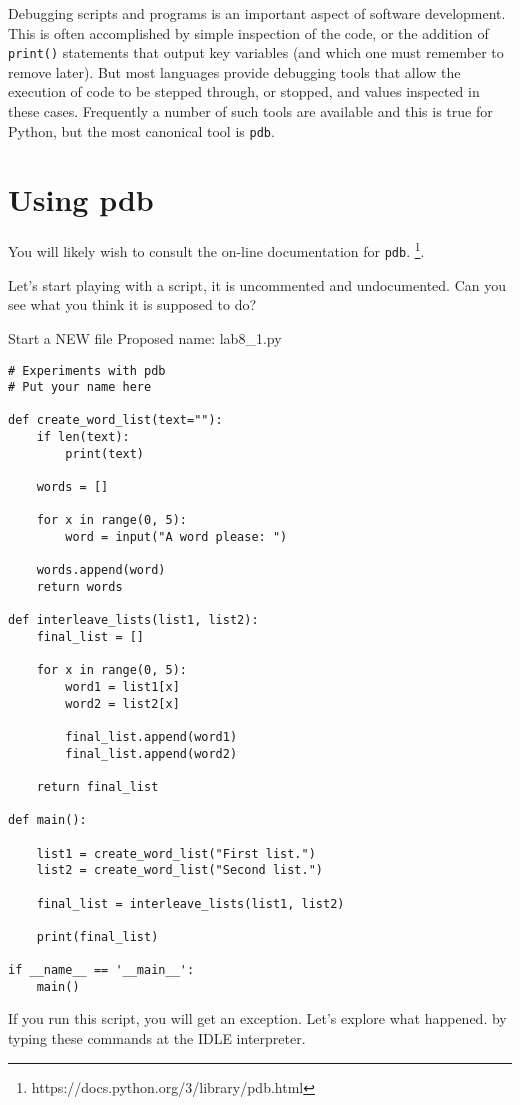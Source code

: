 \documentclass[12pt,oneside]{cttutorial}
\begin{document}
Debugging scripts and programs is an important aspect of software development. This is often accomplished by simple inspection of the code, or the addition of \lstinline!print()! statements that output key variables (and which one must remember to remove later). But most languages provide debugging tools that allow the execution of code to be stepped through, or stopped, and values inspected in these cases. Frequently a number of such tools are available and this is true for Python, but the most canonical tool is \lstinline!pdb!.

\section{Using pdb}

You will likely wish to consult the on-line documentation for \lstinline!pdb!.%
\footnote{https://docs.python.org/3/library/pdb.html}.

Let's start playing with a script, it is uncommented and undocumented. Can you see what you think it is supposed to do?

\alert{Start a NEW file}
Proposed name: lab8\_1.py
\begin{lstlisting}
# Experiments with pdb
# Put your name here

def create_word_list(text=""):
    if len(text):
        print(text)

    words = []

    for x in range(0, 5):
        word = input("A word please: ")

    words.append(word)
    return words

def interleave_lists(list1, list2):
    final_list = []

    for x in range(0, 5):
        word1 = list1[x]
        word2 = list2[x]

        final_list.append(word1)
        final_list.append(word2)
        
    return final_list

def main():

    list1 = create_word_list("First list.")
    list2 = create_word_list("Second list.")

    final_list = interleave_lists(list1, list2)

    print(final_list)

if __name__ == '__main__':
    main()
\end{lstlisting}

If you run this script, you will get an exception. Let's explore what happened. by typing these commands at the IDLE interpreter.
\end{document}
